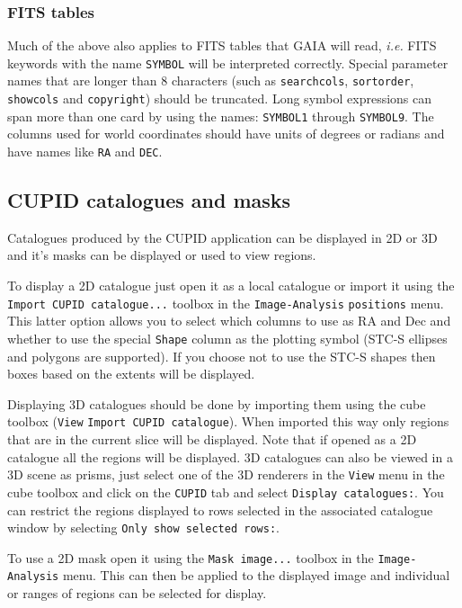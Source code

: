 \documentclass[twoside,11pt]{article}
\newcommand{\xref}[3]{#1}
\renewcommand{\_}{\texttt{\symbol{95}}}
\newcommand{\mytt}[1]{{\texttt{#1}}}
\begin{document}
\subsubsection{FITS tables}

Much of the above also applies to FITS tables that GAIA will read,
\textit{i.e.} FITS keywords with the name \mytt{SYMBOL} will be interpreted
correctly. Special parameter names that are longer than 8 characters (such as
\mytt{search\_cols}, \mytt{sort\_order}, \mytt{show\_cols} and
\mytt{copyright}) should be truncated. Long symbol expressions can span more
than one card by using the names: \mytt{SYMBOL1} through \mytt{SYMBOL9}. The
columns used for world coordinates should have units of degrees or radians and
have names like \mytt{RA} and \mytt{DEC}.

\subsection{CUPID catalogues and masks}

Catalogues produced by the \xref{CUPID}{sun255}{} application can be displayed
in 2D or 3D and it's masks can be displayed or used to view regions.

To display a 2D catalogue just open it as a local catalogue or import it
using the \mytt{Import CUPID catalogue...} toolbox in the \mytt{Image-Analysis}
\mytt{positions} menu. This latter option allows you to select which columns
to use as RA and Dec and whether to use the special \mytt{Shape} column as the
plotting symbol (STC-S ellipses and polygons are supported). If you choose not
to use the STC-S shapes then boxes based on the extents will be displayed.

Displaying 3D catalogues should be done by importing them using the cube
toolbox (\mytt{View} \mytt{Import CUPID catalogue}). When imported this way
only regions that are in the current slice will be displayed. Note that if
opened as a 2D catalogue all the regions will be displayed. 3D catalogues can
also be viewed in a 3D scene as prisms, just select one of the 3D renderers in
the \mytt{View} menu in the cube toolbox and click on the \mytt{CUPID} tab and
select \mytt{Display catalogues:}. You can restrict the regions displayed to
rows selected in the associated catalogue window by selecting \mytt{Only show
selected rows:}.

To use a 2D mask open it using the \mytt{Mask image...} toolbox in the
\mytt{Image-Analysis} menu. This can then be applied to the displayed image
and individual or ranges of regions can be selected for display.
\end{document}
